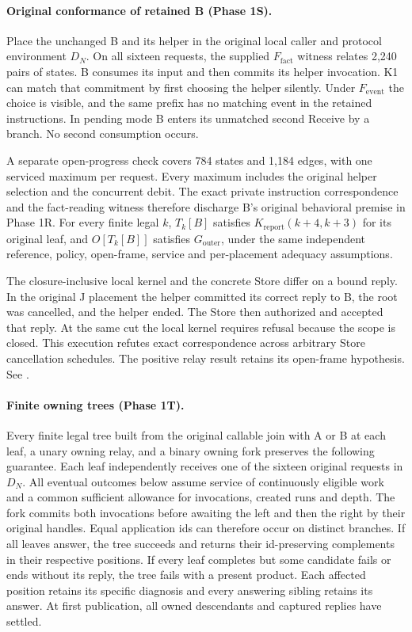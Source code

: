 \documentclass[11pt,a4paper]{article}
\theoremstyle{definition}
\theoremstyle{remark}
\begin{document}
\paragraph{Original conformance of retained B (Phase 1S).} Place the unchanged B and its helper in the original local caller and protocol environment $D_N$. On all sixteen requests, the supplied $F_{\mathrm{fact}}$ witness relates 2,240 pairs of states. B consumes its input and then commits its helper invocation. K1 can match that commitment by first choosing the helper silently. Under $F_{\mathrm{event}}$ the choice is visible, and the same prefix has no matching event in the retained instructions. In pending mode B enters its unmatched second Receive by a branch. No second consumption occurs.

A separate open-progress check covers 784 states and 1,184 edges, with one serviced maximum per request. Every maximum includes the original helper selection and the concurrent debit. The exact private instruction correspondence and the fact-reading witness therefore discharge B's original behavioral premise in Phase 1R. For every finite legal $k$, $T_k[B]$ satisfies $K_{\mathrm{report}}(k+4,k+3)$ for its original leaf, and $O[T_k[B]]$ satisfies $G_{\mathrm{outer}}$, under the same independent reference, policy, open-frame, service and per-placement adequacy assumptions.

The closure-inclusive local kernel and the concrete Store differ on a bound reply. In the original J placement the helper committed its correct reply to B, the root was cancelled, and the helper ended. The Store then authorized and accepted that reply. At the same cut the local kernel requires refusal because the scope is closed. This execution refutes exact correspondence across arbitrary Store cancellation schedules. The positive relay result retains its open-frame hypothesis. See .

\paragraph{Finite owning trees (Phase 1T).} Every finite legal tree built from the original callable join with A or B at each leaf, a unary owning relay, and a binary owning fork preserves the following guarantee. Each leaf independently receives one of the sixteen original requests in $D_N$. All eventual outcomes below assume service of continuously eligible work and a common sufficient allowance for invocations, created runs and depth. The fork commits both invocations before awaiting the left and then the right by their original handles. Equal application ids can therefore occur on distinct branches. If all leaves answer, the tree succeeds and returns their id-preserving complements in their respective positions. If every leaf completes but some candidate fails or ends without its reply, the tree fails with a present product. Each affected position retains its specific diagnosis and every answering sibling retains its answer. At first publication, all owned descendants and captured replies have settled.
\end{document}
